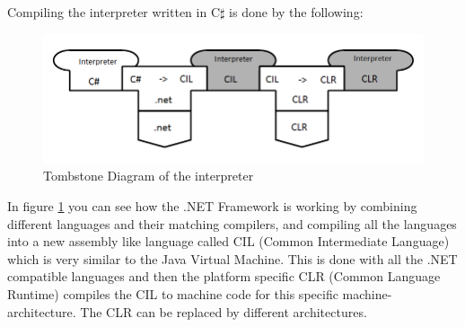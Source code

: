Compiling the interpreter written in C$\sharp$ is done by the following:

			\begin{figure}[H]
				\centering
				\includegraphics[scale=0.75]{rapport/3/figures/tombstone_of_the_interpreter}
				\caption{Tombstone Diagram of the interpreter} \label{fig:tombstone_of_interpreter}
			\end{figure}

In figure \ref{fig:tombstone_of_interpreter} you can see how the .NET Framework is working by combining different languages and their matching compilers, and compiling all the languages into a new assembly like language called CIL (Common Intermediate Language) \cite{CIL} which is very similar to the Java Virtual Machine. This is done with all the .NET compatible languages and then the platform specific CLR (Common Language Runtime) compiles the CIL to machine code for this specific machine-architecture. The CLR can be replaced by different architectures.


			
			